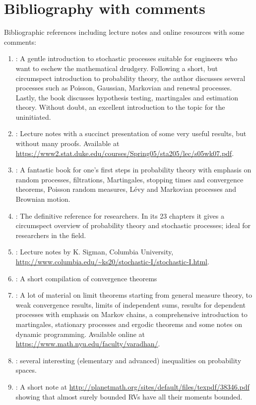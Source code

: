 \documentclass[a4paper,10pt]{article}
\let\oldbibentry\bibentry
\renewcommand{\bibentry}[1]{{\color{blue} \oldbibentry{#1}}}
\begin{document}
\section{Bibliography with comments}
%
Bibliographic references including lecture notes and online resources with some comments:
{\small
\begin{enumerate}
 \item \label{cite:Gallager2013} : A gentle introduction to stochastic 
        processes suitable for engineers who want to eschew the mathematical drudgery. 
        Following a short, but circumspect introduction to probability theory, the author 
        discusses several processes such as Poisson, Gaussian, Markovian and renewal processes. 
        Lastly, the book discusses hypothesis testing, martingales and estimation theory. 
        Without doubt, an excellent introduction to the topic for the uninitiated. 
 \item \label{cite:RLWolpert05} : Lecture notes with a succinct presentation 
	of some very useful results, but without many proofs. 
	Available at \url{https://www2.stat.duke.edu/courses/Spring05/sta205/lec/s05wk07.pdf}.
 \item \label{cite:cinlar2011} : A fantastic book for one's first 
       steps in probability theory with 
       emphasis on random processes, filtrations, Martingales, stopping times and convergence 
       theorems, Poisson random measures, L{\'{e}}vy and Markovian processes and Brownian motion.
 \item \label{cite:Kallnberg} : The definitive reference for researchers. In its 23 chapters
       it gives a circumspect overview of probability theory and stochastic processes; ideal for researchers in the field.
 \item \label{cite:KSigman2009}: Lecture notes by K. Sigman, Columbia University,
       \url{http://www.columbia.edu/~ks20/stochastic-I/stochastic-I.html}.
 \item \label{cite:DWalnut2011} : A short compilation of convergence theorems       
 \item \label{cite:Varadhan} : A lot of material on limit theorems 
       starting from general measure theory, to weak convergence results, limits 
       of independent sums, results for dependent processes 
       with emphasis on Markov chains, a comprehensive introduction to martingales, stationary processes
       and ergodic theorems and some notes on dynamic programming. 
       Available online at \url{https://www.math.nyu.edu/faculty/varadhan/}.
 \item \label{cite:LinBai2011} : several interesting (elementary 
       and advanced) inequalities on probability spaces.  
 \item \label{cite:Ambrosio2013} : A short note at
       \url{http://planetmath.org/sites/default/files/texpdf/38346.pdf}
       showing that almost surely bounded RVs have all their moments bounded.
\end{enumerate}
}



\end{document}
